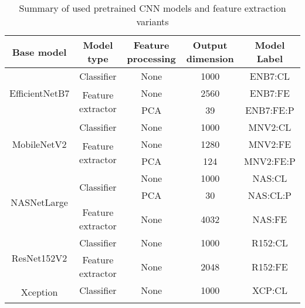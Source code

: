 \documentclass[a4paper,fleqn]{cas-sc}
\begin{document}
\begin{table}[]
\caption{Summary of used pretrained CNN models and feature extraction variants}
\begin{tabular}{|c|c|c|c|c|}
\hline
Base model                      & Model type                         & Feature processing & Output dimension & Model Label \\ \hline
\multirow{3}{*}{EfficientNetB7} & Classifier                         & None               & 1000             & ENB7:CL     \\ \cline{2-5} 
                                & \multirow{2}{*}{Feature extractor} & None               & 2560             & ENB7:FE     \\ \cline{3-5} 
                                &                                    & PCA                & 39               & ENB7:FE:P   \\ \hline
\multirow{3}{*}{MobileNetV2}    & Classifier                         & None               & 1000             & MNV2:CL     \\ \cline{2-5} 
                                & \multirow{2}{*}{Feature extractor} & None               & 1280             & MNV2:FE     \\ \cline{3-5} 
                                &                                    & PCA                & 124              & MNV2:FE:P   \\ \hline
\multirow{3}{*}{NASNetLarge}    & \multirow{2}{*}{Classifier}        & None               & 1000             & NAS:CL      \\ \cline{3-5} 
                                &                                    & PCA                & 30               & NAS:CL:P    \\ \cline{2-5} 
                                & Feature extractor                  & None               & 4032             & NAS:FE      \\ \hline
\multirow{2}{*}{ResNet152V2}    & Classifier                         & None               & 1000             & R152:CL     \\ \cline{2-5} 
                                & Feature extractor                  & None               & 2048             & R152:FE     \\ \hline
\multirow{2}{*}{Xception}       & Classifier                         & None               & 1000             & XCP:CL      \\ \cline{2-5} 

\end{tabular}
\end{table}
\end{document}
